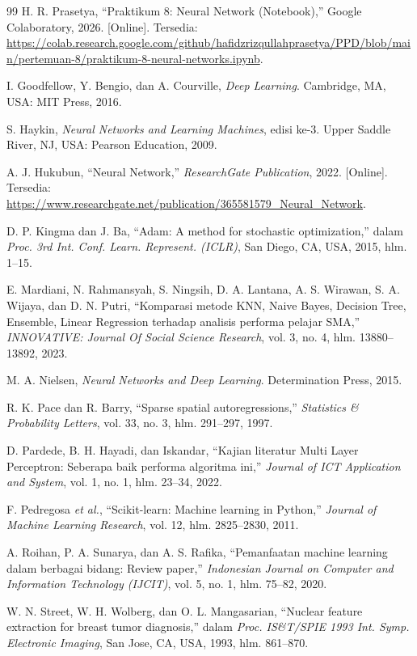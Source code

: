 \documentclass[a4paper,oneside,12pt]{report}
\begin{document}
\clearpage

\begin{thebibliography}{99}
	 H. R. Prasetya, ``Praktikum 8: Neural Network (Notebook),'' Google Colaboratory, 2026. [Online]. Tersedia: \url{https://colab.research.google.com/github/hafidzrizqullahprasetya/PPD/blob/main/pertemuan-8/praktikum-8-neural-networks.ipynb}.

	 I. Goodfellow, Y. Bengio, dan A. Courville, \textit{Deep Learning}. Cambridge, MA, USA: MIT Press, 2016.

	 S. Haykin, \textit{Neural Networks and Learning Machines}, edisi ke-3. Upper Saddle River, NJ, USA: Pearson Education, 2009.

	 A. J. Hukubun, ``Neural Network,'' \textit{ResearchGate Publication}, 2022. [Online]. Tersedia: \url{https://www.researchgate.net/publication/365581579_Neural_Network}.

	 D. P. Kingma dan J. Ba, ``Adam: A method for stochastic optimization,'' dalam \textit{Proc. 3rd Int. Conf. Learn. Represent. (ICLR)}, San Diego, CA, USA, 2015, hlm. 1--15.

	 E. Mardiani, N. Rahmansyah, S. Ningsih, D. A. Lantana, A. S. Wirawan, S. A. Wijaya, dan D. N. Putri, ``Komparasi metode KNN, Naive Bayes, Decision Tree, Ensemble, Linear Regression terhadap analisis performa pelajar SMA,'' \textit{INNOVATIVE: Journal Of Social Science Research}, vol. 3, no. 4, hlm. 13880--13892, 2023.

	 M. A. Nielsen, \textit{Neural Networks and Deep Learning}. Determination Press, 2015.

	 R. K. Pace dan R. Barry, ``Sparse spatial autoregressions,'' \textit{Statistics \& Probability Letters}, vol. 33, no. 3, hlm. 291--297, 1997.

	 D. Pardede, B. H. Hayadi, dan Iskandar, ``Kajian literatur Multi Layer Perceptron: Seberapa baik performa algoritma ini,'' \textit{Journal of ICT Application and System}, vol. 1, no. 1, hlm. 23--34, 2022.

	 F. Pedregosa \textit{et al.}, ``Scikit-learn: Machine learning in Python,'' \textit{Journal of Machine Learning Research}, vol. 12, hlm. 2825--2830, 2011.

	 A. Roihan, P. A. Sunarya, dan A. S. Rafika, ``Pemanfaatan machine learning dalam berbagai bidang: Review paper,'' \textit{Indonesian Journal on Computer and Information Technology (IJCIT)}, vol. 5, no. 1, hlm. 75--82, 2020.

	 W. N. Street, W. H. Wolberg, dan O. L. Mangasarian, ``Nuclear feature extraction for breast tumor diagnosis,'' dalam \textit{Proc. IS\&T/SPIE 1993 Int. Symp. Electronic Imaging}, San Jose, CA, USA, 1993, hlm. 861--870.
\end{thebibliography}
\end{document}
